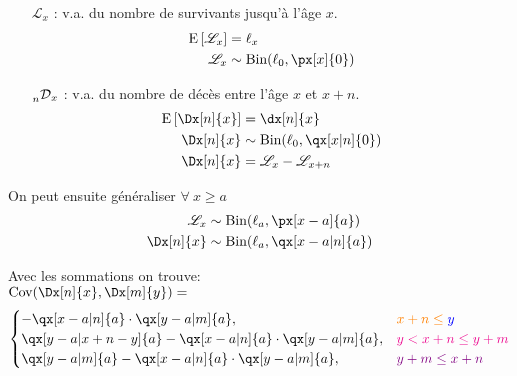 \documentclass[10pt, french]{article}
\begin{document}
\begin{multicols*}{3}
\begin{itemize}
\item[$\mathscr{L}_x$ : ] v.a. du nombre de survivants jusqu'à l'âge $x$.
\begin{align*}
\esp{\mathscr{L}_x} &= \ell_x\\
\mathscr{L}_x &\sim \text{Bin}(\ell_0, \px[x]{0}) \\
\end{align*}
\item[$\prescript{}{n}{\mathcal{D}}_x$ : ] v.a. du nombre de décès entre l'âge $x$ et $x+n$.
\begin{align*}
	\esp{\Dx[n]{x}} &= \dx[n]{x} \\
	\Dx[n]{x} &\sim \text{Bin}(\ell_0, \qx[x| n]{0}) \\
	\Dx[n]{x} &= \mathscr{L}_x - \mathscr{L}_{x+n} \\
\end{align*}
\end{itemize}

On peut ensuite généraliser $\forall \ x \ge a$ 
\begin{align*}
	\mathscr{L}_x &\sim \text{Bin}(\ell_a, \px[x - a]{a}) \\
	\Dx[n]{x} &\sim \text{Bin}(\ell_a, \qx[x - a | n]{a}) \\
\end{align*}

Avec les sommations on trouve:\\
$\text{Cov}( \Dx[n]{x}, \Dx[m]{y} )  =$
\[
	\begin{cases}
		- \qx[x - a | n]{a} \cdot \qx[y - a | m]{a}, & \color{orange}{x + n} \le\color{blue}{ y} \\
		\qx[y - a | x + n - y]{a} - \qx[x - a | n]{a} \cdot \qx[y - a | m]{a}, & \color{magenta}{y < x + n \le y + m} \\
		\qx[y - a | m]{a} - \qx[x - a | n]{a} \cdot \qx[y - a | m]{a}, & \color{violet}{y + m \le x + n} \\
	\end{cases}
\]
\\

\end{multicols*}
\end{document}
